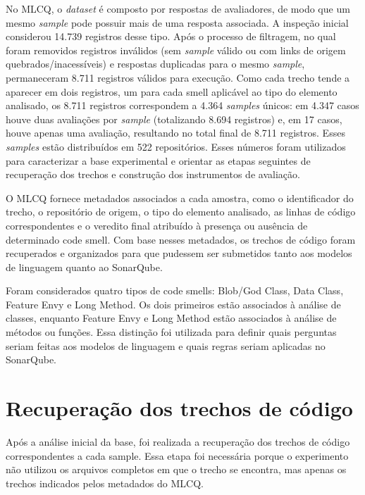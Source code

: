 No MLCQ, o \textit{dataset} é composto por respostas de avaliadores, de modo que um mesmo \textit{sample} pode possuir mais de uma resposta associada. A inspeção inicial considerou 14.739 registros desse tipo. Após o processo de filtragem, no qual foram removidos registros inválidos (sem \textit{sample} válido ou com links de origem quebrados/inacessíveis) e respostas duplicadas para o mesmo \textit{sample}, permaneceram 8.711 registros válidos para execução. Como cada trecho tende a aparecer em dois registros, um para cada smell aplicável ao tipo do elemento analisado, os 8.711 registros correspondem a 4.364 \textit{samples} únicos: em 4.347 casos houve duas avaliações por \textit{sample} (totalizando 8.694 registros) e, em 17 casos, houve apenas uma avaliação, resultando no total final de 8.711 registros. Esses \textit{samples} estão distribuídos em 522 repositórios. Esses números foram utilizados para caracterizar a base experimental e orientar as etapas seguintes de recuperação dos trechos e construção dos instrumentos de avaliação.




O MLCQ fornece metadados associados a cada amostra, como o identificador do trecho, o repositório de origem, o tipo do elemento analisado, 
as linhas de código correspondentes e o veredito final atribuído à presença ou ausência de determinado code smell. Com base nesses metadados, 
os trechos de código foram recuperados e organizados para que pudessem ser submetidos tanto aos modelos de linguagem quanto ao SonarQube.

Foram considerados quatro tipos de code smells: Blob/God Class, Data Class, Feature Envy e Long Method. Os dois primeiros estão associados 
à análise de classes, enquanto Feature Envy e Long Method estão associados à análise de métodos ou funções. Essa distinção foi utilizada para 
definir quais perguntas seriam feitas aos modelos de linguagem e quais regras seriam aplicadas no SonarQube.


\section{Recuperação dos trechos de código}

Após a análise inicial da base, foi realizada a recuperação dos trechos de código correspondentes a cada sample. 
Essa etapa foi necessária porque o experimento não utilizou os arquivos completos em que o trecho se encontra, mas apenas os trechos
indicados pelos metadados do MLCQ.

